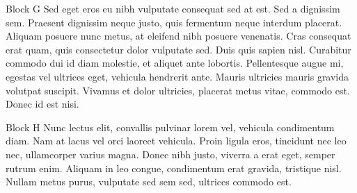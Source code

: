 \documentclass{beamer}
\begin{document}
\begin{frame}
\begin{columns}[t]
\begin{column}{.3\paperwidth}
\begin{block}{Block G}
			Sed eget eros eu nibh vulputate consequat sed at est. Sed a dignissim sem. Praesent dignissim neque justo, quis fermentum neque interdum placerat. Aliquam posuere nunc metus, at eleifend nibh posuere venenatis. Cras consequat erat quam, quis consectetur dolor vulputate sed. Duis quis sapien nisl. Curabitur commodo dui id diam molestie, et aliquet ante lobortis. Pellentesque augue mi, egestas vel ultrices eget, vehicula hendrerit ante. Mauris ultricies mauris gravida volutpat suscipit. Vivamus et dolor ultricies, placerat metus vitae, commodo est. Donec id est nisi. 
		\end{block}
		\vfill
		\baselineskip
		\begin{block}{Block H}
			Nunc lectus elit, convallis pulvinar lorem vel, vehicula condimentum diam. Nam at lacus vel orci laoreet vehicula. Proin ligula eros, tincidunt nec leo nec, ullamcorper varius magna. Donec nibh justo, viverra a erat eget, semper rutrum enim. Aliquam in leo congue, condimentum erat gravida, tristique nisl. Nullam metus purus, vulputate sed sem sed, ultrices commodo est. 
		\end{block}
	\end{column}
\end{columns}
\end{frame}
\end{document}
